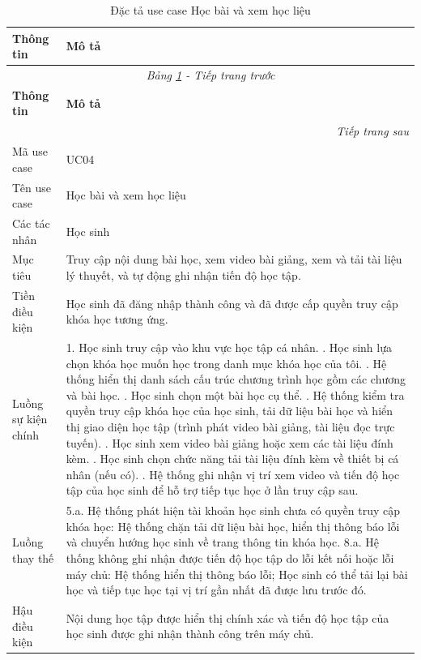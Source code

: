 ﻿\documentclass[../DoAn.tex]{subfiles}
\begin{document}
\begin{longtable}{|p{3.5cm}|p{10.5cm}|}
\caption{Đặc tả use case Học bài và xem học liệu}
\label{table:uc04_hoc_bai_xem_hoc_lieu} \\
\hline
\textbf{Thông tin} & \textbf{Mô tả} \\ \hline
\endfirsthead

\hline
\multicolumn{2}{|c|}{\textit{Bảng \ref{table:uc04_hoc_bai_xem_hoc_lieu} - Tiếp trang trước}} \\ \hline
\textbf{Thông tin} & \textbf{Mô tả} \\ \hline
\endhead

\hline
\multicolumn{2}{|r|}{\textit{Tiếp trang sau}} \\ \hline
\endfoot

\hline
\endlastfoot

Mã use case & UC04 \\ \hline
Tên use case & Học bài và xem học liệu \\ \hline
Các tác nhân & Học sinh \\ \hline
Mục tiêu & Truy cập nội dung bài học, xem video bài giảng, xem và tải tài liệu lý thuyết, và tự động ghi nhận tiến độ học tập. \\ \hline
Tiền điều kiện & Học sinh đã đăng nhập thành công và đã được cấp quyền truy cập khóa học tương ứng. \\ \hline
Luồng sự kiện chính & 
1. Học sinh truy cập vào khu vực học tập cá nhân. \newline
2. Học sinh lựa chọn khóa học muốn học trong danh mục khóa học của tôi. \newline
3. Hệ thống hiển thị danh sách cấu trúc chương trình học gồm các chương và bài học. \newline
4. Học sinh chọn một bài học cụ thể. \newline
5. Hệ thống kiểm tra quyền truy cập khóa học của học sinh, tải dữ liệu bài học và hiển thị giao diện học tập (trình phát video bài giảng, tài liệu đọc trực tuyến). \newline
6. Học sinh xem video bài giảng hoặc xem các tài liệu đính kèm. \newline
7. Học sinh chọn chức năng tải tài liệu đính kèm về thiết bị cá nhân (nếu có). \newline
8. Hệ thống ghi nhận vị trí xem video và tiến độ học tập của học sinh để hỗ trợ tiếp tục học ở lần truy cập sau. \\ \hline
Luồng thay thế & 
5.a. Hệ thống phát hiện tài khoản học sinh chưa có quyền truy cập khóa học: Hệ thống chặn tải dữ liệu bài học, hiển thị thông báo lỗi và chuyển hướng học sinh về trang thông tin khóa học. \newline
8.a. Hệ thống không ghi nhận được tiến độ học tập do lỗi kết nối hoặc lỗi máy chủ: Hệ thống hiển thị thông báo lỗi; Học sinh có thể tải lại bài học và tiếp tục học tại vị trí gần nhất đã được lưu trước đó. \\ \hline
Hậu điều kiện & Nội dung học tập được hiển thị chính xác và tiến độ học tập của học sinh được ghi nhận thành công trên máy chủ. \\ \hline
\end{longtable}
\endgroup
\end{document}
